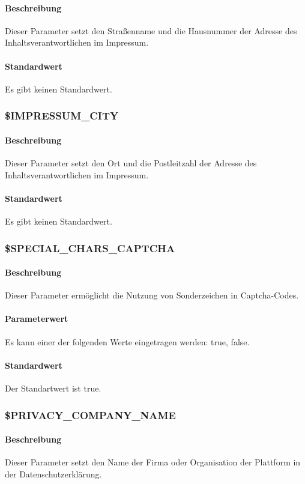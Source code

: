\paragraph{Beschreibung}Dieser Parameter setzt den Straßenname und die Hausnummer der Adresse des Inhaltsverantwortlichen im Impressum.
\paragraph{Standardwert}Es gibt keinen Standardwert.

\subsubsection{\$IMPRESSUM\_CITY} \label{config:impressum-city}
\paragraph{Beschreibung}Dieser Parameter setzt den Ort und die Postleitzahl der Adresse des Inhaltsverantwortlichen im Impressum.
\paragraph{Standardwert}Es gibt keinen Standardwert.

\subsubsection{\$SPECIAL\_CHARS\_CAPTCHA}
\paragraph{Beschreibung}Dieser Parameter ermöglicht die Nutzung von Sonderzeichen in Captcha-Codes.
\paragraph{Parameterwert}Es kann einer der folgenden Werte eingetragen werden: {\glqq true\grqq}, {\glqq false\grqq}.
\paragraph{Standardwert}Der Standartwert ist {\glqq true\grqq}.

\subsubsection{\$PRIVACY\_COMPANY\_NAME} \label{config:privacy-comp-name}
\paragraph{Beschreibung}Dieser Parameter setzt den Name der Firma oder Organisation der Plattform in der Datenschutzerklärung.
